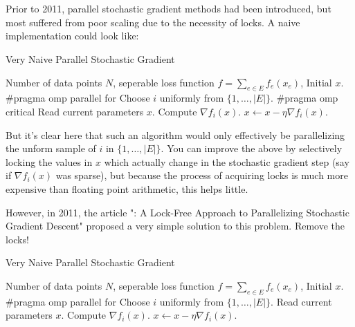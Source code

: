 \section{\hogwild}

Prior to 2011, parallel stochastic gradient methods had been introduced, but
most suffered from poor scaling due to the necessity of locks. A naive
implementation could look like:
\begin{breakablealgorithm}
  \caption{Very Naive Parallel Stochastic Gradient}
  \label{alg:naivePSG}
  \begin{algorithmic}[1]
    \Require Number of data points $N$, seperable loss function $f
    = \sum_{e \in E} f_e(x_e)$, Initial $x$.
      \State \#pragma omp parallel for
        \State Choose $i$ uniformly from $\{1, \dots, |E|\}$.
        \State \#pragma omp critical
        \Indent
          \State Read current parameters $x$.
          \State Compute $\nabla f_i(x)$.
          \State $x \gets x - \eta \nabla f_i(x)$.
        \EndIndent
      \EndFor
    \EndFor
  \end{algorithmic}
\end{breakablealgorithm}
But it's clear here that such an algorithm would only effectively be
parallelizing the unform sample of $i$ in $\{1, \dots, |E|\}$. You can improve
the above by selectively locking the values in $x$ which actually change in the
stochastic gradient step (say if $\nabla f_i(x)$ was sparse), but because the
process of acquiring locks is much more expensive than floating point
arithmetic, this helps little.

However, in 2011, the article "\hogwild: A Lock-Free Approach to Parallelizing
Stochastic Gradient Descent" proposed a very simple solution to this problem.
Remove the locks!
\begin{breakablealgorithm}
  \caption{Very Naive Parallel Stochastic Gradient}
  \label{alg:naivePSG}
  \begin{algorithmic}[1]
    \Require Number of data points $N$, seperable loss function $f
    = \sum_{e \in E} f_e(x_e)$, Initial $x$.
      \State \#pragma omp parallel for
        \State Choose $i$ uniformly from $\{1, \dots, |E|\}$.
        \State Read current parameters $x$.
        \State Compute $\nabla f_i(x)$.
        \State $x \gets x - \eta \nabla f_i(x)$.
      \EndFor
    \EndFor
  \end{algorithmic}
\end{breakablealgorithm}
